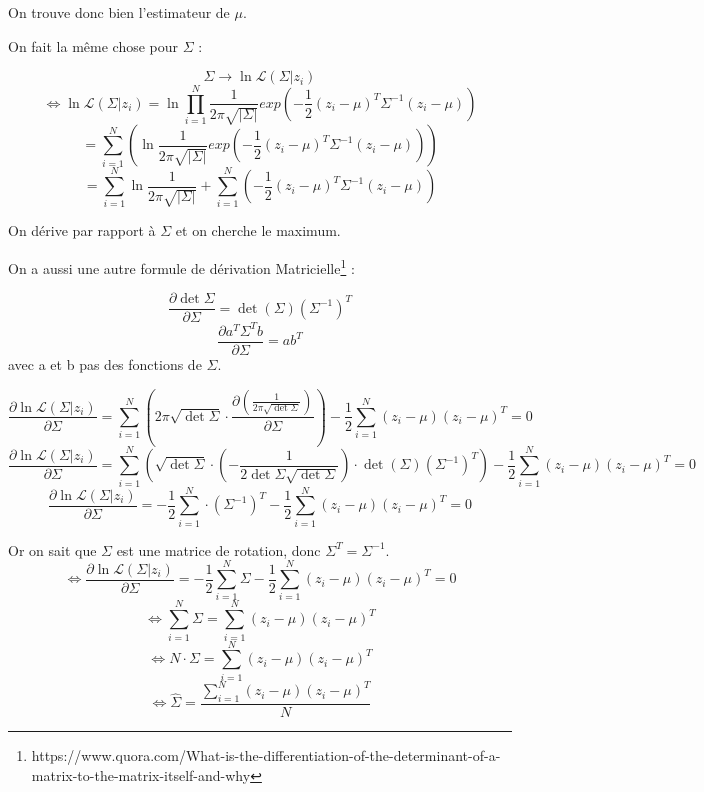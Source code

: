 \documentclass{article}
\begin{document}
On trouve donc bien l'estimateur de $\mu$.

On fait la même chose pour $\Sigma$ :

$$\Sigma \rightarrow \ln \mathcal{L}(\Sigma | z_i)$$
$$\Leftrightarrow \ln \mathcal{L}(\Sigma | z_i)=\ln \prod_{i=1}^{N} \frac{1}{2\pi\sqrt{|\Sigma|}}exp(-\frac{1}{2}(z_i-\mu)^{T}\Sigma^{-1}(z_i-\mu))$$
$$= \sum_{i=1}^{N} (\ln \frac{1}{2\pi\sqrt{|\Sigma|}}exp(-\frac{1}{2}(z_i-\mu)^{T}\Sigma^{-1}(z_i-\mu)))$$
$$= \sum_{i=1}^{N}\ln \frac{1}{2\pi\sqrt{|\Sigma|}} + \sum_{i=1}^{N}(-\frac{1}{2}(z_i-\mu)^{T}\Sigma^{-1}(z_i-\mu))$$

On dérive par rapport à $\Sigma$ et on cherche le maximum.

On a aussi une autre formule de dérivation Matricielle\footnote{https://www.quora.com/What-is-the-differentiation-of-the-determinant-of-a-matrix-to-the-matrix-itself-and-why} :

$$\frac{\partial \det\Sigma}{\partial \Sigma} = \det(\Sigma)(\Sigma^{-1})^{T}$$
$$\frac{\partial a^{T}\Sigma^{T}b}{\partial \Sigma} = ab^{T}$$
avec a et b pas des fonctions de $\Sigma$.

$$\frac{\partial \ln \mathcal{L}(\Sigma | z_i)}{\partial \Sigma}=\sum_{i=1}^{N}(2\pi\sqrt{\det\Sigma}\cdot\frac{\partial (\frac{1}{2\pi\sqrt{\det \Sigma}})}{\partial \Sigma})-\frac{1}{2}\sum_{i=1}^{N}(z_i-\mu)(z_i-\mu)^{T}=0$$
$$\frac{\partial \ln \mathcal{L}(\Sigma | z_i)}{\partial \Sigma}=\sum_{i=1}^{N}(\sqrt{\det\Sigma}\cdot(-\frac{1}{2\det\Sigma \sqrt{\det \Sigma}})\cdot\det(\Sigma)(\Sigma^{-1})^{T})-\frac{1}{2}\sum_{i=1}^{N}(z_i-\mu)(z_i-\mu)^{T}=0$$
$$\frac{\partial \ln \mathcal{L}(\Sigma | z_i)}{\partial \Sigma}=-\frac{1}{2}\sum_{i=1}^{N}\cdot(\Sigma^{-1})^{T}-\frac{1}{2}\sum_{i=1}^{N}(z_i-\mu)(z_i-\mu)^{T}=0$$

Or on sait que $\Sigma$ est une matrice de rotation, donc $\Sigma^{T}=\Sigma^{-1}$.
$$\Leftrightarrow \frac{\partial \ln \mathcal{L}(\Sigma | z_i)}{\partial \Sigma}=-\frac{1}{2}\sum_{i=1}^{N}\Sigma-\frac{1}{2}\sum_{i=1}^{N}(z_i-\mu)(z_i-\mu)^{T}=0$$
$$\Leftrightarrow \sum_{i=1}^{N}\Sigma=\sum_{i=1}^{N}(z_i-\mu)(z_i-\mu)^{T}$$
$$\Leftrightarrow N\cdot\Sigma=\sum_{i=1}^{N}(z_i-\mu)(z_i-\mu)^{T}$$
$$\Leftrightarrow \hat{\Sigma}=\frac{\sum_{i=1}^{N}(z_i-\mu)(z_i-\mu)^{T}}{N}$$
\end{document}
